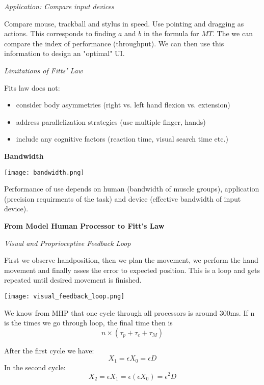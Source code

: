 \textit{Application: Compare input devices} \smallskip

Compare mouse, trackball and stylus in speed. Use pointing and dragging as actions. This corresponds to finding $a$ and $b$ in the formula for $MT$. The we can compare the index of performance (throughput). We can then use this information to design an "optimal" UI. \medskip

\textit{Limitations of Fitts' Law} \smallskip

Fits law does not: 


\begin{itemize}[itemsep=-5pt, topsep=0pt, leftmargin=*]
    \item consider body asymmetries (right vs. left hand flexion vs. extension)
    \item address parallelization strategies (use multiple finger, hands)
    \item include any cognitive factors (reaction time, visual search time etc.)
\end{itemize}
\medskip

\textbf{Bandwidth} \smallskip


\begin{center}
	\texttt{[image: bandwidth.png]}
\end{center}

\medskip

Performance of use depends on human (bandwidth of muscle groups), application (precision requirments of the task) and device (effective bandwidth of input device). \medskip


\textbf{From Model Human Processor to Fitt's Law} \smallskip

\textit{Visual and Proprioceptive Feedback Loop} \smallskip

First we observe handposition, then we plan the movement, we perform the hand movement and finally asses the error to expected position. This is a loop and gets repeated until desired movement is finished. 


\begin{center}
	\texttt{[image: visual\_feedback\_loop.png]}
\end{center}

We know from MHP that one cycle through all processors is around 300ms. If n is the times we go through loop, the final time then is
$$n \times (\tau_p + \tau_c + \tau_M)$$

After the first cycle we have:
$$X_1 = \epsilon X_0 = \epsilon D$$
In the second cycle:
$$X_2 = \epsilon X_1 = \epsilon(\epsilon X_0)= \epsilon^2 D$$

